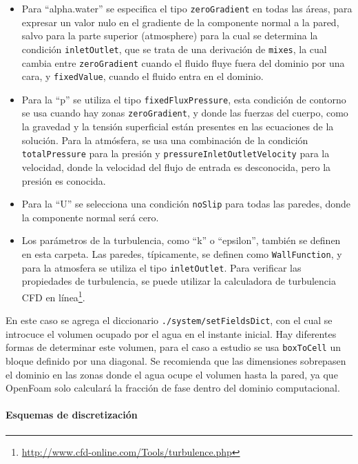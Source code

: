 \begin{itemize}
\item
  Para ``alpha.water'' se especifica el tipo \texttt{zeroGradient} en
  todas las áreas, para expresar un valor nulo en el gradiente de la
  componente normal a la pared, salvo para la parte superior
  (atmosphere) para la cual se determina la condición
  \texttt{inletOutlet}, que se trata de una derivación de
  \texttt{mixes}, la cual cambia entre \texttt{zeroGradient} cuando el
  fluido fluye fuera del dominio por una cara, y \texttt{fixedValue},
  cuando el fluido entra en el dominio.
\item
  Para la ``p'' se utiliza el tipo \texttt{fixedFluxPressure}, esta
  condición de contorno se usa cuando hay zonas \texttt{zeroGradient}, y
  donde las fuerzas del cuerpo, como la gravedad y la tensión
  superficial están presentes en las ecuaciones de la solución. Para la
  atmósfera, se usa una combinación de la condición
  \texttt{totalPressure} para la presión y
  \texttt{pressureInletOutletVelocity} para la velocidad, donde la
  velocidad del flujo de entrada es desconocida, pero la presión es
  conocida.
\item
  Para la ``U'' se selecciona una condición \texttt{noSlip} para todas
  las paredes, donde la componente normal será cero.
\item
  Los parámetros de la turbulencia, como ``k'' o ``epsilon'', también se
  definen en esta carpeta. Las paredes, típicamente, se definen como
  \texttt{WallFunction}, y para la atmosfera se utiliza el tipo
  \texttt{inletOutlet}. Para verificar las propiedades de turbulencia,
  se puede utilizar la calculadora de turbulencia CFD en línea\footnote{\url{http://www.cfd-online.com/Tools/turbulence.php}}.
\end{itemize}

En este caso se agrega el diccionario
\lstinline[style=bash]{./system/setFieldsDict}, con el cual se
introcuce el volumen ocupado por el agua en el instante inicial. Hay
diferentes formas de determinar este volumen, para el caso a estudio se
usa \texttt{boxToCell} un bloque definido por una diagonal. Se
recomienda que las dimensiones sobrepasen el dominio en las zonas donde
el agua ocupe el volumen hasta la pared, ya que OpenFoam solo calculará
la fracción de fase dentro del dominio computacional.

\paragraph{Esquemas de discretización}\label{header-n199}

